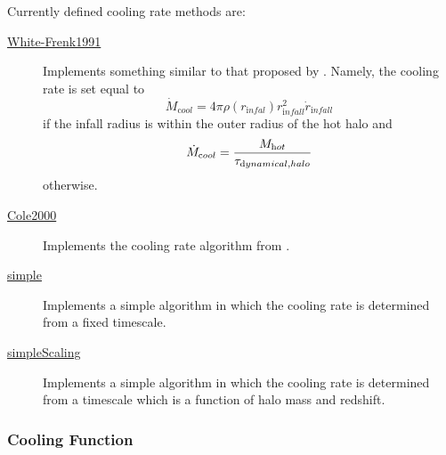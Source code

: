Currently defined cooling rate methods are:
\begin{description}
 \item [\hyperlink{cooling.cooling_rate.White-Frenk.F90:cooling_rates_white_frenk:cooling_rate_white_frenk}{{\normalfont \ttfamily White-Frenk1991}}] Implements something similar to that proposed by \cite{white_galaxy_1991}. Namely, the cooling rate is set equal to
 \begin{equation}
  \dot{M}_{\mathrm cool} = 4 \pi \rho(r_{\mathrm infal}) r_{\mathrm infall}^2 \dot{r}_{\mathrm infall}
 \end{equation}
 if the infall radius is within the outer radius of the hot halo and
 \begin{equation}
  \dot{M}_{\mathrm cool} = {M_{\mathrm hot} \over \tau_{\mathrm dynamical,halo}}
 \end{equation}
 otherwise.
\item [\hyperlink{cooling.cooling_rate.Cole2000.F90:cooling_rates_cole2000:cooling_rate_cole2000}{{\normalfont \ttfamily Cole2000}}] Implements the cooling rate algorithm from \cite{cole_hierarchical_2000}.
\item [\hyperlink{cooling.cooling_rate.simple.F90:cooling_rates_simple:cooling_rate_simple}{{\normalfont \ttfamily simple}}] Implements a simple algorithm in which the cooling rate is determined from a fixed timescale.
\item [\hyperlink{cooling.cooling_rate.simple_scaling.F90:cooling_rates_simple_scaling:cooling_rate_simple_scaling}{{\normalfont \ttfamily simpleScaling}}] Implements a simple algorithm in which the cooling rate is determined from a timescale which is a function of halo mass and redshift.
\end{description}

\subsubsection{Cooling Function}\label{sec:CoolingFunctionMethods}

